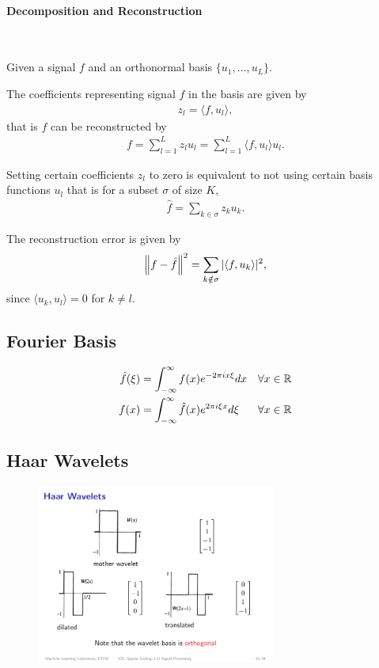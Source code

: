 \paragraph{Decomposition and Reconstruction} $\ $
\begin{description}
\item Given a signal $f$ and an orthonormal basis $\{u_1,\ldots, u_L\}$.
\item The coefficients representing signal $f$ in the basis are given by 
    \begin{align*}
        z_l = \langle f, u_l \rangle,
    \end{align*}
    that is $f$ can be reconstructed by
    \begin{align*}
         f=\sum_{l=1}^L z_lu_l = \sum_{l=1}^L \langle f,u_l\rangle u_l.
    \end{align*}
\item Setting certain coefficients $z_l$ to zero is equivalent to not using certain basis functions $u_l$ that is for a subset $\sigma$  of size $K$,
    \begin{align*}
        \hat f = \sum_{k\in \sigma} z_ku_k.
    \end{align*}
\item The reconstruction error is given by
    \begin{align*}
        \left\lVert f-\hat f\right\rVert^2 = \sum_{k\notin \sigma} |\langle f,u_k\rangle|^2,
    \end{align*}
    since $\langle u_k, u_l\rangle = 0$ for $k\neq l$.
\end{description}

\subsection{Fourier Basis}
\begin{align*}
 \hat f(\xi) &= \int_{-\infty}^\infty f(x) e^{-2\pi ix\xi} dx & \forall x \in \mathbb{R}\\
 f(x) &= \int_{-\infty}^\infty \hat f(x) e^{2\pi i\xi x}d\xi & \forall x\in \mathbb{R}
\end{align*}

\subsection{Haar Wavelets}
\begin{figure}[H]
\centering
\includegraphics[width=0.7\textwidth]{img/08_haar_wavelets}
\end{figure}


